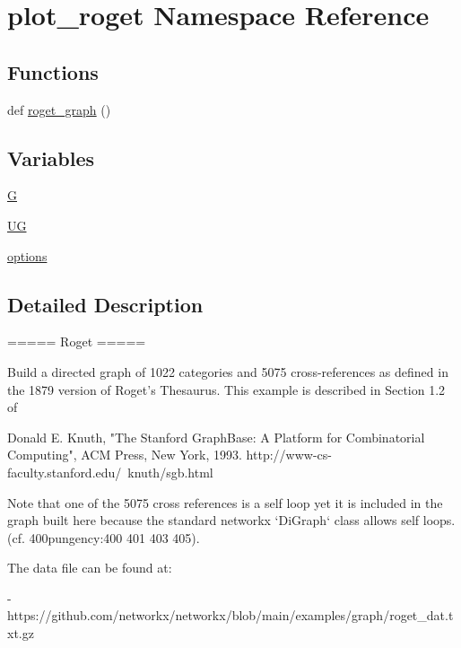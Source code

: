\hypertarget{namespaceplot__roget}{}\section{plot\+\_\+roget Namespace Reference}
\label{namespaceplot__roget}
\subsection*{Functions}
\begin{DoxyCompactItemize}
\item 
def \hyperlink{namespaceplot__roget_a68a3c4fa2f48d1c57eb4b9f17b31b4ff}{roget\+\_\+graph} ()
\end{DoxyCompactItemize}
\subsection*{Variables}
\begin{DoxyCompactItemize}
\item 
\hyperlink{namespaceplot__roget_a571531a7df84b3fc52a822fff9facd4b}{G}
\item 
\hyperlink{namespaceplot__roget_a68c0b463d5c13c9834d9841af94dc962}{UG}
\item 
\hyperlink{namespaceplot__roget_a889a371eb115bd18f040b255d2b958ba}{options}
\end{DoxyCompactItemize}


\subsection{Detailed Description}
\begin{DoxyVerb}=====
Roget
=====

Build a directed graph of 1022 categories and 5075 cross-references as defined
in the 1879 version of Roget's Thesaurus. This example is described in Section
1.2 of

Donald E. Knuth, "The Stanford GraphBase: A Platform for Combinatorial
Computing", ACM Press, New York, 1993.
http://www-cs-faculty.stanford.edu/~knuth/sgb.html

Note that one of the 5075 cross references is a self loop yet it is included in
the graph built here because the standard networkx `DiGraph` class allows self
loops.  (cf. 400pungency:400 401 403 405).

The data file can be found at:

- https://github.com/networkx/networkx/blob/main/examples/graph/roget_dat.txt.gz
\end{DoxyVerb}
 

